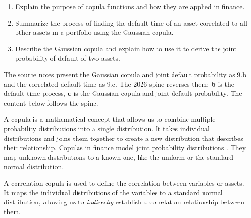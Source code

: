 
\begin{mrkeybox}[title={Learning objectives in this reading}]
\small
\begin{enumerate}[label=\textbf{\alph*.},leftmargin=1.7em]
\item Explain the purpose of copula functions and how they are applied in finance.
\item Summarize the process of finding the default time of an asset correlated to all other
      assets in a portfolio using the Gaussian copula.
\item Describe the Gaussian copula and explain how to use it to derive the joint probability of
      default of two assets.
\end{enumerate}
\end{mrkeybox}

\begin{mrtrapbox}[title={Note on ordering}]
The source notes present the Gaussian copula and joint default probability as 9.b and the
correlated default time as 9.c. The 2026 spine reverses them: \textbf{b} is the default time
process, \textbf{c} is the Gaussian copula and joint default probability. The content below
follows the spine.
\end{mrtrapbox}


\begin{mrdefbox}[title={What a copula is}]
A copula is a mathematical concept that allows us to combine multiple probability distributions
into a single distribution. It takes individual distributions and joins them together to create
a new distribution that describes their relationship. Copulas in finance model joint probability
distributions . They map unknown
distributions to a known one, like the uniform or the standard normal distribution.
\end{mrdefbox}

\begin{mrkeybox}[title={Correlation copulas}]
A correlation copula is used to define the correlation between variables or assets. It maps the
individual distributions of the variables to a standard normal distribution, allowing us to
\textit{indirectly} establish a correlation relationship between them.
\end{mrkeybox}


